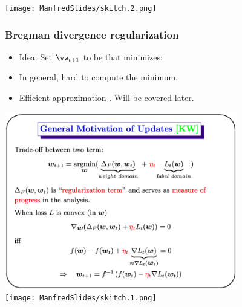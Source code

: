 \documentclass[handout]{beamer}
\begin{document}
\texttt{[image: ManfredSlides/skitch.2.png]}


\begin{frame}
\frametitle{Bregman divergence regularization}
\begin{itemize}
\item Idea: Set $\vw_{t+1}$ to be  \R{$\vu$} that minimizes:
\item In general, hard to compute the minimum.
\item Efficient approximation . Will be covered later.
\end{itemize}
\end{frame}

\includegraphics[width=4in]{ManfredSlides/skitch3.png}\\
\texttt{[image: ManfredSlides/skitch.1.png]}
\end{document}
